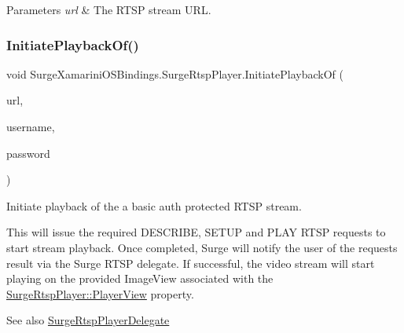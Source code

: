 \begin{DoxyParams}{Parameters}
{\em url} & The R\+T\+SP stream U\+RL.\\
\hline
\end{DoxyParams}
\mbox{\label{interface_surge_xamarini_o_s_bindings_1_1_surge_rtsp_player_aed2fc640fe87633d54ba35a618b1240d}} 
\subsubsection{\texorpdfstring{Initiate\+Playback\+Of()}{InitiatePlaybackOf()}\hspace{0.1cm}{\footnotesize\ttfamily [2/3]}}
{\footnotesize\ttfamily void Surge\+Xamarini\+O\+S\+Bindings.\+Surge\+Rtsp\+Player.\+Initiate\+Playback\+Of (\begin{DoxyParamCaption}\item[{N\+S\+Url}]{url,  }\item[{N\+S\+String}]{username,  }\item[{N\+S\+String}]{password }\end{DoxyParamCaption})}



Initiate playback of the a basic auth protected R\+T\+SP stream. 

This will issue the required D\+E\+S\+C\+R\+I\+BE, S\+E\+T\+UP and P\+L\+AY R\+T\+SP requests to start stream playback. Once completed, Surge will notify the user of the requests result via the Surge R\+T\+SP delegate. If successful, the video stream will start playing on the provided Image\+View associated with the \hyperlink{interface_surge_xamarini_o_s_bindings_1_1_surge_rtsp_player_ab629f9303d6b427a8213e1dee03a3810}{Surge\+Rtsp\+Player\+::\+Player\+View} property.

\begin{DoxySeeAlso}{See also}
\hyperlink{interface_surge_xamarini_o_s_bindings_1_1_surge_rtsp_player_delegate}{Surge\+Rtsp\+Player\+Delegate} 
\end{DoxySeeAlso}



